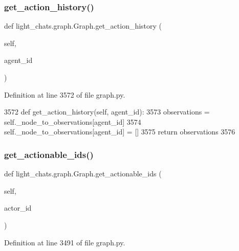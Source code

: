 \subsubsection{\texorpdfstring{get\+\_\+action\+\_\+history()}{get\_action\_history()}}
{\footnotesize\ttfamily def light\+\_\+chats.\+graph.\+Graph.\+get\+\_\+action\+\_\+history (\begin{DoxyParamCaption}\item[{}]{self,  }\item[{}]{agent\+\_\+id }\end{DoxyParamCaption})}



Definition at line 3572 of file graph.\+py.


\begin{DoxyCode}
3572     \textcolor{keyword}{def }get\_action\_history(self, agent\_id):
3573         observations = self.\_node\_to\_observations[agent\_id]
3574         self.\_node\_to\_observations[agent\_id] = []
3575         \textcolor{keywordflow}{return} observations
3576 
\end{DoxyCode}
\mbox{\label{classlight__chats_1_1graph_1_1Graph_a04cea64dfded92bfd69055e184aa390d}} 
\subsubsection{\texorpdfstring{get\+\_\+actionable\+\_\+ids()}{get\_actionable\_ids()}}
{\footnotesize\ttfamily def light\+\_\+chats.\+graph.\+Graph.\+get\+\_\+actionable\+\_\+ids (\begin{DoxyParamCaption}\item[{}]{self,  }\item[{}]{actor\+\_\+id }\end{DoxyParamCaption})}



Definition at line 3491 of file graph.\+py.



